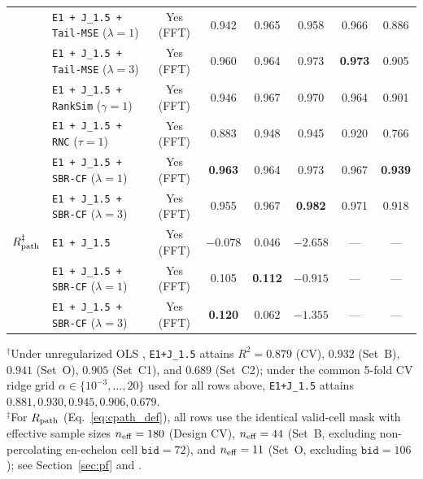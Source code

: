 \documentclass[preprint,11pt,a4paper]{elsarticle}
\begin{document}
\begin{table}[ht!]
{\begin{tabular}{llcccccc}
 & \texttt{E1 + J\_1.5 + Tail-MSE} ($\lambda=1$) & Yes (FFT) & 0.942 & 0.965 & 0.958 & 0.966 & 0.886 \\
 & \texttt{E1 + J\_1.5 + Tail-MSE} ($\lambda=3$) & Yes (FFT) & 0.960 & 0.964 & 0.973 & \textbf{0.973} & 0.905 \\
 & \texttt{E1 + J\_1.5 + RankSim} ($\gamma=1$) & Yes (FFT) & 0.946 & 0.967 & 0.970 & 0.964 & 0.901 \\
 & \texttt{E1 + J\_1.5 + RNC} ($\tau=1$) & Yes (FFT) & 0.883 & 0.948 & 0.945 & 0.920 & 0.766 \\
 & \texttt{E1 + J\_1.5 + SBR-CF} ($\lambda=1$) & Yes (FFT) & \textbf{0.963} & 0.964 & 0.973 & 0.967 & \textbf{0.939} \\
 & \texttt{E1 + J\_1.5 + SBR-CF} ($\lambda=3$) & Yes (FFT) & 0.955 & 0.967 & \textbf{0.982} & 0.971 & 0.918 \\
\midrule
$R_{\rm path}^{\ddagger}$
 & \texttt{E1 + J\_1.5} & Yes (FFT) & $-0.078$ & 0.046 & $-2.658$ & --- & --- \\
 & \texttt{E1 + J\_1.5 + SBR-CF} ($\lambda=1$) & Yes (FFT) & 0.105 & \textbf{0.112} & $-0.915$ & --- & --- \\
 & \texttt{E1 + J\_1.5 + SBR-CF} ($\lambda=3$) & Yes (FFT) & \textbf{0.120} & 0.062 & $-1.355$ & --- & --- \\
\bottomrule
\end{tabular}%
}
\par\smallskip\raggedright{\footnotesize $^\dagger$Under unregularized OLS \cite{GomezOvalle2026}, \texttt{E1+J\_1.5} attains $R^2=0.879$ (CV), $0.932$ (Set~B), $0.941$ (Set~O), $0.905$ (Set~C1), and $0.689$ (Set~C2); under the common 5-fold CV ridge grid $\alpha\in\{10^{-3},\dots,20\}$ used for all rows above, \texttt{E1+J\_1.5} attains $0.881, 0.930, 0.945, 0.906, 0.679$.\\
$^\ddagger$For $R_{\rm path}$ (Eq.~\eqref{eq:cpath_def}), all rows use the identical valid-cell mask with effective sample sizes $n_{\rm eff}=180$ (Design CV), $n_{\rm eff}=44$ (Set~B, excluding non-percolating en-echelon cell $\texttt{bid}=72$), and $n_{\rm eff}=11$ (Set~O, excluding $\texttt{bid}=106$); see Section~\ref{sec:pf} and .}
\end{table}
\end{document}
